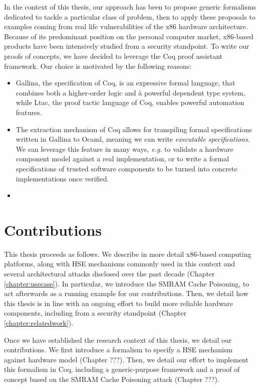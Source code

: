 In the context of this thesis, our approach has been to propose generic
formalisms dedicated to tackle a particular class of problem, then to apply
these proposals to examples coming from real life vulnerabilities of the x86
hardware architecture.
%
Because of its predominant position on the personal computer market, x86-based
products have been intensively studied from a security standpoint.
%
To write our proofs of concepts, we have decided to leverage the Coq proof
assistant framework.
%
Our choice is motivated by the following reasons:
%
\begin{itemize}
\item {\sc Gallina}, the specification of Coq, is an expressive formal language,
  that combines both a higher-order logic and à powerful dependent type system,
  while {\sc Ltac}, the proof tactic language of Coq, enables powerful
  automation features.
\item The extraction mechanism of Coq allows for transpiling formal
  specifications written in {\sc Gallina} to {\sc Ocaml}, meaning we can write
  \emph{executable specifications}. We can leverage this feature in many ways,
  \emph{e.g.} to validate a hardware component model against a real
  implementation, or to write a formal specifications of trusted software
  components to be turned into concrete implementations once verified.
\item {}
\end{itemize}

\section{Contributions}

This thesis proceeds as follows.
%
We describe in more detail x86-based computing platforms, along with HSE
mechanisms commonly used in this context and several architectural attacks
disclosed over the past decade (Chapter\,\ref{chapter:usecase}).
%
In particular, we introduce the SMRAM Cache Poisoning, to act afterwards as a
running example for our contributions.
%
Then, we detail how this thesis is in line with an ongoing effort to build more
reliable hardware components, including from a security standpoint
(Chapter\,\ref{chapter:relatedwork}).

Once we have established the research context of this thesis, we detail our
contributions.
%
We first introduce a formalism to specify a HSE mechanism against hardware model
(Chapter ???).
%
Then, we detail our effort to implement this formalism in Coq, including a
generic-purpose framework and a proof of concept based on the SMRAM Cache
Poisoning attack (Chapter ???).
%
